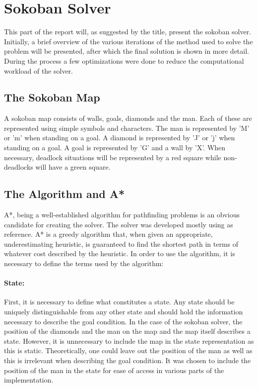 \section{Sokoban Solver}
This part of the report will, as suggested by the title, present the sokoban solver.
Initially, a brief overview of the various iterations of the method used to solve the problem will be presented, after which the final solution is shown in more detail.
During the process a few optimizations were done to reduce the computational workload of the solver.

\subsection{The Sokoban Map}
A sokoban map consists of walls, goals, diamonds and the man. 
Each of these are represented using simple symbols and characters.
The man is represented by 'M' or 'm' when standing on a goal. 
A diamond is represented by 'J' or 'j' when standing on a goal.
A goal is represented by 'G' and a wall by 'X'.
When necessary, deadlock situations will be represented by a red square while non-deadlocks will have a green square.

\subsection{The Algorithm and A*}
A*, being a well-established algorithm for pathfinding problems is an obvious candidate for creating the solver.
The solver was developed mostly using \cite{stanford} as reference.
A* is a greedy algorithm that, when given an appropriate, underestimating heuristic, is guaranteed to find the shortest path in terms of whatever cost described by the heuristic.
In order to use the algorithm, it is necessary to define the terms used by the algorithm:

\paragraph{State:}
First, it is necessary to define what constitutes a state. 
Any state should be uniquely distinguishable from any other state and should hold the information necessary to describe the goal condition.
In the case of the sokoban solver, the position of the diamonds and the man on the map and the map itself describes a state.
However, it is unnecessary to include the map in the state representation as this is static.
Theoretically, one could leave out the position of the man as well as this is irrelevant when describing the goal condition.
It was chosen to include the position of the man in the state for ease of access in various parts of the implementation.

